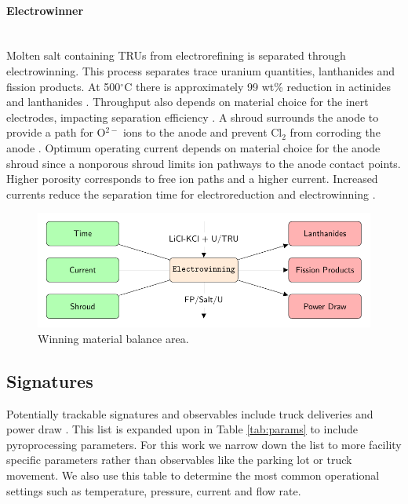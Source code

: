 \paragraph{Electrowinner} \mbox{}\\
Molten salt containing \glspl{TRU} from electrorefining is separated through electrowinning. This process separates trace uranium quantities, lanthanides and fission products. 
At 500$^{\circ}$C there is approximately 99 wt\% reduction in actinides and lanthanides \cite{flowsheet_1998}. 
Throughput also depends on material choice for the inert electrodes, impacting separation 
efficiency \cite{koyama_development_2012}. A shroud surrounds the anode to provide a path for O$^{2-}$ ions to the anode and 
prevent Cl$_2$ from corroding the anode \cite{kim_development_2013,choi_electrochemical_2015}. Optimum operating current 
depends on material choice for the anode shroud since a nonporous shroud limits ion pathways to the anode contact points.
Higher porosity corresponds to free ion paths and a higher current. Increased currents reduce the separation time for electroreduction and electrowinning \cite{choi_electrochemical_2015}.

\begin{figure}[h] 
	\centering
	\includegraphics[width=0.8\linewidth]{images/winning}
	\caption{Winning material balance area.}
	\label{fig:winning}
\end{figure}

\subsection{Signatures}

Potentially trackable signatures and observables include truck deliveries and  power draw  \cite{Hou_2016,Yilmaz_2016}. This list is expanded upon in Table \ref{tab:params} to include pyroprocessing parameters. For this work we narrow down the list to more facility specific parameters rather than observables like the parking lot or truck movement. We also use this table
to determine the most common operational settings such as temperature, pressure, current and flow rate.

